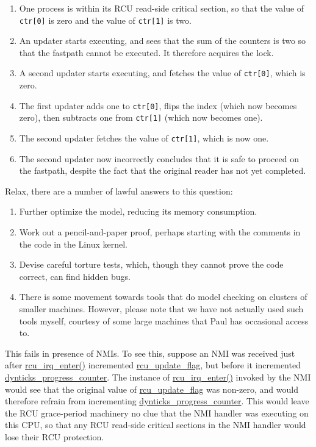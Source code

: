\begin{enumerate}
\item	One process is within its RCU read-side critical
	section, so that the value of {\tt ctr[0]} is zero and
	the value of {\tt ctr[1]} is two.
\item	An updater starts executing, and sees that the sum of
	the counters is two so that the fastpath cannot be
	executed.  It therefore acquires the lock.
\item	A second updater starts executing, and fetches the value
	of {\tt ctr[0]}, which is zero.
\item	The first updater adds one to {\tt ctr[0]}, flips
	the index (which now becomes zero), then subtracts
	one from {\tt ctr[1]} (which now becomes one).
\item	The second updater fetches the value of {\tt ctr[1]},
	which is now one.
\item	The second updater now incorrectly concludes that it
	is safe to proceed on the fastpath, despite the fact
	that the original reader has not yet completed.
\end{enumerate}


	Relax, there are a number of lawful answers to
	this question:
	\begin{enumerate}
	\item	Further optimize the model, reducing its memory consumption.
	\item	Work out a pencil-and-paper proof, perhaps starting with the
		comments in the code in the Linux kernel.
	\item	Devise careful torture tests, which, though they cannot prove
		the code correct, can find hidden bugs.
	\item	There is some movement towards tools that do model
		checking on clusters of smaller machines.
		However, please note that we have not actually used such
		tools myself, courtesy of some large machines that Paul has
		occasional access to.
	\end{enumerate}


	This fails in presence of NMIs.
	To see this, suppose an NMI was received just after
	\url{rcu_irq_enter()} incremented \url{rcu_update_flag},
	but before it incremented \url{dynticks_progress_counter}.
	The instance of \url{rcu_irq_enter()} invoked by the NMI
	would see that the original value of \url{rcu_update_flag}
	was non-zero, and would therefore refrain from incrementing
	\url{dynticks_progress_counter}.
	This would leave the RCU grace-period machinery no clue that the
	NMI handler was executing on this CPU, so that any RCU read-side
	critical sections in the NMI handler would lose their RCU protection.

